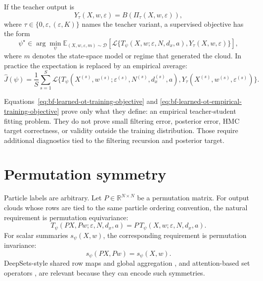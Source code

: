 If the teacher output is
\[
  Y_\tau(X,w,\varepsilon)=B(\Pi_\tau(X,w,\varepsilon)),
\]
where $\tau\in\{0,\varepsilon,(\varepsilon,K)\}$ names the teacher variant, a
supervised objective has the form
\begin{equation}
\label{eq:bf-learned-ot-training-objective}
  \psi^\star
  \in
  \arg\min_\psi
  \mathbb E_{(X,w,\varepsilon,m)\sim \mathcal D}
  \left[
    \mathcal L\{T_\psi(X,w;\varepsilon,N,d_x,a),Y_\tau(X,w,\varepsilon)\}
  \right],
\end{equation}
where $m$ denotes the state-space model or regime that generated the cloud.  In
practice the expectation is replaced by an empirical average:
\begin{equation}
\label{eq:bf-learned-ot-empirical-training-objective}
  \widehat J(\psi)
  =
  \frac{1}{S}
  \sum_{s=1}^S
  \mathcal L\{T_\psi(X^{(s)},w^{(s)};\varepsilon^{(s)},N^{(s)},d_x^{(s)},a),
  Y_\tau(X^{(s)},w^{(s)},\varepsilon^{(s)})\}.
\end{equation}

Equations~\eqref{eq:bf-learned-ot-training-objective} and
\eqref{eq:bf-learned-ot-empirical-training-objective} prove only what they
define: an empirical teacher-student fitting problem.  They do not prove small
filtering error, posterior error, HMC target correctness, or validity outside
the training distribution.  Those require additional diagnostics tied to the
filtering recursion and posterior target.

\section{Permutation symmetry}
\label{sec:bf-learned-ot-symmetry}

Particle labels are arbitrary.  Let $P\in\mathbb{R}^{N\times N}$ be a
permutation matrix.  For output clouds whose rows are tied to the same particle
ordering convention, the natural requirement is permutation equivariance:
\begin{equation}
\label{eq:bf-learned-ot-equivariance}
  T_\psi(PX,Pw;\varepsilon,N,d_x,a)
  =
  P\,T_\psi(X,w;\varepsilon,N,d_x,a).
\end{equation}
For scalar summaries $s_\psi(X,w)$, the corresponding requirement is
permutation invariance:
\begin{equation}
\label{eq:bf-learned-ot-invariance}
  s_\psi(PX,Pw)=s_\psi(X,w).
\end{equation}
DeepSets-style shared row maps and global aggregation
\citep{zaheer2017deep}, and attention-based set operators
\citep{lee2019set}, are relevant because they can encode such symmetries.


